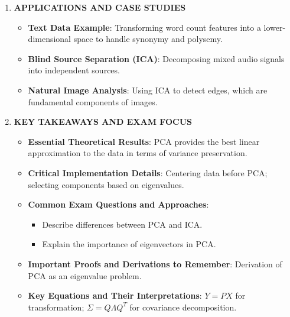 \documentclass[
  12pt,
]{report}
\providecommand{\tightlist}{%
  \setlength{\itemsep}{0pt}\setlength{\parskip}{0pt}}
\begin{document}
\begin{enumerate}
\begin{itemize}
    Compute covariance matrix Σ = (1/n) ∑(x\_i - μ)(x\_i - μ)\^{}T
    Perform eigenvalue decomposition Σ = QΛQ\^{}T
    Select top M eigenvectors from Q for transformation matrix P
    ```

    \begin{itemize}
    \tightlist
    \item
      \textbf{Complexity Analysis}: \(O(N^3)\) for eigenvalue decomposition.
    \item
      \textbf{Convergence Properties}: PCA converges to a solution with minimal reconstruction error in the least-squares sense.
    \item
      \textbf{Optimization Techniques}: Eigenvalue decomposition; Singular Value Decomposition (SVD).
    \end{itemize}
  \end{itemize}
\item
  \textbf{APPLICATIONS AND CASE STUDIES}

  \begin{itemize}
  \tightlist
  \item
    \textbf{Text Data Example}: Transforming word count features into a lower-dimensional space to handle synonymy and polysemy.
  \item
    \textbf{Blind Source Separation (ICA)}: Decomposing mixed audio signals into independent sources.
  \item
    \textbf{Natural Image Analysis}: Using ICA to detect edges, which are fundamental components of images.
  \end{itemize}
\item
  \textbf{KEY TAKEAWAYS AND EXAM FOCUS}

  \begin{itemize}
  \tightlist
  \item
    \textbf{Essential Theoretical Results}: PCA provides the best linear approximation to the data in terms of variance preservation.
  \item
    \textbf{Critical Implementation Details}: Centering data before PCA; selecting components based on eigenvalues.
  \item
    \textbf{Common Exam Questions and Approaches}:

    \begin{itemize}
    \tightlist
    \item
      Describe differences between PCA and ICA.
    \item
      Explain the importance of eigenvectors in PCA.
    \end{itemize}
  \item
    \textbf{Important Proofs and Derivations to Remember}: Derivation of PCA as an eigenvalue problem.
  \item
    \textbf{Key Equations and Their Interpretations}: \(Y = PX\) for transformation; \(Σ = QΛQ^T\) for covariance decomposition.
  \end{itemize}
\end{enumerate}
\end{document}

